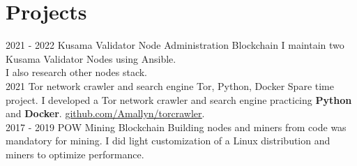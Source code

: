 \documentclass[]{cv-class}
\begin{document}
\section{Projects}
\begin{entrylist}
  \entry
    {2021 - 2022}
    {Kusama Validator Node Administration}
    {Blockchain}
    {I maintain two Kusama Validator Nodes using Ansible.\\
    I also research other nodes stack.\\}
  \entry
    {2021}
    {Tor network crawler and search engine}
    {Tor, Python, Docker}
    {Spare time project. I developed a Tor network crawler and search engine practicing \textbf{Python} and \textbf{Docker}. \underline{\href{https://github.com/Amallyn/torcrawler}{github.com/Amallyn/torcrawler}}.\\}
  \entry
    {2017 - 2019}
    {POW Mining}
    {Blockchain}
    {Building nodes and miners from code was mandatory for mining. I did light customization of a Linux distribution and miners to optimize performance.}
\end{entrylist}

\end{document}
